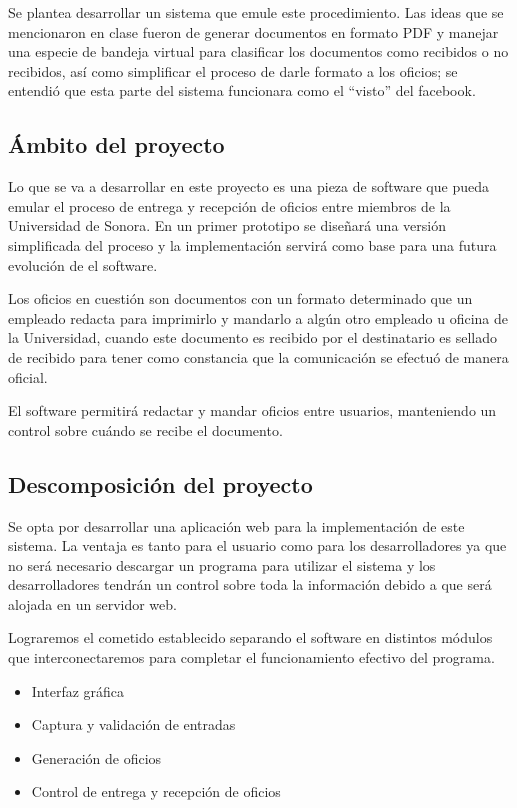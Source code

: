 \documentclass[letterpaper]{article}
\begin{document}
Se plantea desarrollar un sistema que emule este procedimiento. Las ideas que se mencionaron en clase fueron de generar documentos en formato PDF y manejar una especie de bandeja virtual para clasificar los documentos como recibidos o no recibidos, así como simplificar el proceso de darle formato a los oficios; se entendió que esta parte del sistema funcionara como el ``visto'' del facebook.

\subsection{Ámbito del proyecto}

Lo que se va a desarrollar en este proyecto es una pieza de software que pueda emular el proceso de entrega y recepción de oficios entre miembros de la Universidad de Sonora. En un primer prototipo se diseñará una versión simplificada del proceso y la implementación servirá como base para una futura evolución de el software.

Los oficios en cuestión son documentos con un formato determinado que un empleado redacta para imprimirlo y mandarlo a algún otro empleado u oficina de la Universidad, cuando este documento es recibido por el destinatario es sellado de recibido para tener como constancia que la comunicación se efectuó de manera oficial.

El software permitirá redactar y mandar oficios entre usuarios, manteniendo un control sobre cuándo se recibe el documento.

\subsection{Descomposición del proyecto}

Se opta por desarrollar una aplicación web para la implementación de este sistema. La ventaja es tanto para el usuario como para los desarrolladores ya que no será necesario descargar un programa para utilizar el sistema y los desarrolladores tendrán un control sobre toda la información debido a que será alojada en un servidor web.

Lograremos el cometido establecido separando el software en distintos módulos que interconectaremos para completar el funcionamiento efectivo del programa.

\begin{itemize}
\item Interfaz gráfica
\item Captura y validación de entradas
\item Generación de oficios
\item Control de entrega y recepción de oficios
\end{itemize}
\end{document}
